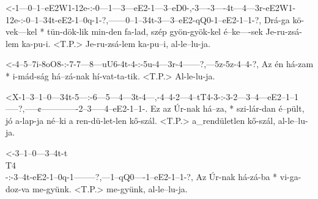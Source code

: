 

  {<-1---0--1--eE2W1-12e-:-0---1---3---eE2-1---3--eD0-,-3----3----4t---4---3r-eE2W1-12e-:-0--1--34t-eE2-1--0q-1-?,------0--1--34t-3---3--eE2-qQ0-1--eE2-1--1-?,}
  {  Drá-ga kö-vek---kel * tün-dök-lik min-den fa-lad,  szép gyön-gyök-kel é--ke----sek   Je-ru-zsá-lem ka-pu-i. <T.P.> Je-ru-zsá-lem ka-pu--i,  al-le--lu-ja.}


  {<-4--5--7i-8oO8-:-7-7---8---uU6-4t-4-:-5u-4---3r-4------?,---5z-5z-4--4-?,}
  {  Az én há-zam  * i-mád-ság há--zá-nak hí-vat-ta-tik. <T.P.> Al-le-lu-ja.}


  {<X-1--3--1--0---34t-5---:-6---5---4---3t-4---,-4--4-2---4--tT4-3-:-3-2---3--4---eE2--1--1-----?,-----¢-------------2--3-----4--eE2-1--1-.}
  {   Ez az Úr-nak há--za, * szi-lár-dan é--pült, jó a-lap-ja né--ki  a ren-dü-let-len  kő-szál. <T.P.> a_rendületlen kő-szál, al-le--lu-ja.}


  {<-3--1--0---3--4t-t\\T4\\-:-3--4t-eE2-1--0q-1--------?,---1--qQ0----1--eE2-1--1-?,}
  {  Az Úr-nak há-zá-ba      * vi-ga-doz-va me-gyünk. <T.P.> me-gyünk, al-le--lu-ja.}


